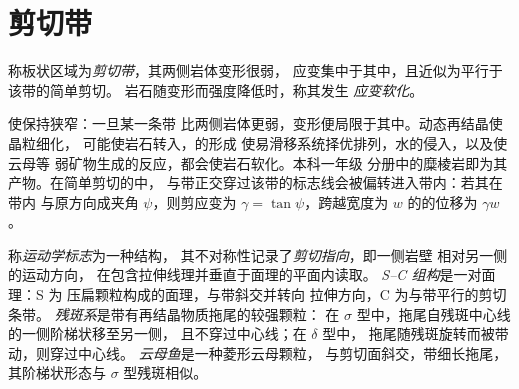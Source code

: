 \section{剪切带}

\begin{definition}\label{def:b3:deformation-mechanisms:shear-zone}
称板状区域为\emph{剪切带}，其两侧岩体变形很弱，
应变集中于其中，且近似为平行于该带的简单剪切。
岩石随变形而强度降低时，称其发生
\emph{应变软化}。
\end{definition}

使保持狭窄：一旦某一条带
比两侧岩体更弱，变形便局限于其中。动态再结晶使晶粒细化，
可能使岩石转入，的形成
使易滑移系统择优排列，水的侵入，以及使云母等
弱矿物生成的反应，都会使岩石软化。本科一年级
分册中的糜棱岩即为其产物。在简单剪切的中，
与带正交穿过该带的标志线会被偏转进入带内：若其在带内
与原方向成夹角 $\psi$，则剪应变为 $\gamma
= \tan\psi$，跨越宽度为 $w$ 的的位移为 $\gamma w$。

\begin{definition}[运动学标志]\label{def:b3:deformation-mechanisms:kinematic}
称\emph{运动学标志}为一种结构，
其不对称性记录了\emph{剪切指向}，即一侧岩壁
相对另一侧的运动方向，
在包含拉伸线理并垂直于面理的平面内读取。
\emph{S--C 组构}是一对面理：S 为
压扁颗粒构成的面理，与带斜交并转向
拉伸方向，C 为与带平行的剪切条带。
\emph{残斑系}是带有再结晶物质拖尾的较强颗粒：
在 $\sigma$ 型中，拖尾自残斑中心线的一侧阶梯状移至另一侧，
且不穿过中心线；在 $\delta$ 型中，
拖尾随残斑旋转而被带动，则穿过中心线。
\emph{云母鱼}是一种菱形云母颗粒，
与剪切面斜交，带细长拖尾，其阶梯状形态与 $\sigma$ 型残斑相似。
\end{definition}

